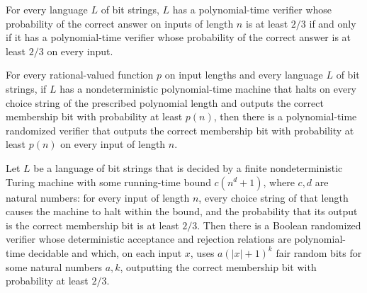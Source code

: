 \begin{theorem}
\label{Randomized.inBPPWith_iff_inBPP}
\leanok
{}
For every language $L$ of bit strings, $L$ has a polynomial-time verifier whose
probability of the correct answer on inputs of length $n$ is at least $2/3$ if and only
if it has a polynomial-time verifier whose probability of the correct answer is at least
$2/3$ on every input.
\end{theorem}

\begin{theorem}
\label{Randomized.inBPPWith_of_mem_BPP_PTMWith}
\leanok
{}
For every rational-valued function $p$ on input lengths and every language $L$ of bit
strings, if $L$ has a nondeterministic polynomial-time machine that halts on every
choice string of the prescribed polynomial length and outputs the correct membership bit
with probability at least $p(n)$, then there is a polynomial-time randomized verifier
that outputs the correct membership bit with probability at least $p(n)$ on every input
of length $n$.
\end{theorem}

\begin{theorem}
\label{Randomized.inBPP_of_mem_BPP_PTM}
\leanok
{}
Let $L$ be a language of bit strings that is decided by a finite nondeterministic Turing
machine with some running-time bound $c(n^d+1)$, where $c,d$ are natural numbers: for
every input of length $n$, every choice string of that length causes the machine to halt
within the bound, and the probability that its output is the correct membership bit is
at least $2/3$. Then there is a Boolean randomized verifier whose deterministic
acceptance and rejection relations are polynomial-time decidable and which, on each
input $x$, uses $a(|x|+1)^k$ fair random bits for some natural numbers $a,k$, outputting
the correct membership bit with probability at least $2/3$.
\end{theorem}

